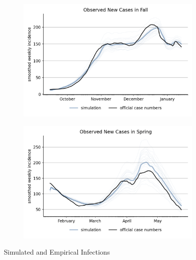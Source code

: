 \begin{figure}[ht]
\centering
\begin{subfigure}{.6\textwidth}
  \includegraphics[width=0.9 \textwidth]{../figures/results/figures/comparisons/fall_fit/full_new_known_case}
\end{subfigure}%
\begin{subfigure}{.6\textwidth}
  \includegraphics[width=0.9 \textwidth]{../figures/results/figures/comparisons/spring_fit/full_new_known_case}
\end{subfigure}
\caption{Simulated and Empirical Infections}
\label{fig:aggregated_fit}
\end{figure}




